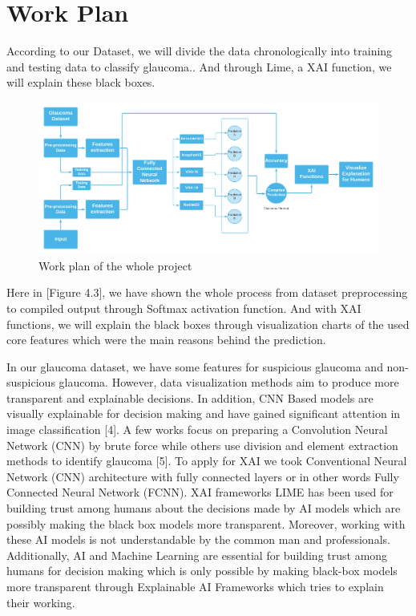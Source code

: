 \newpage
\section{Work Plan} 
According to our Dataset, we will divide the data chronologically into training and testing data to classify glaucoma.. And through Lime, a XAI function, we will explain these black boxes.

\begin{figure}[htbp]
\centering
\includegraphics[scale=0.08]{images/work plan.png}
\caption{Work plan of the whole project}
\label{fig:x Work plan of the whole project}
\end{figure}

\vspace{5mm}
\noindent Here in [Figure 4.3], we have shown the whole process from dataset preprocessing to compiled output through Softmax activation function. And with XAI functions, we will explain the black boxes through visualization charts of the used core features which were the main reasons behind the prediction.

\vspace{5mm}
\noindent In our glaucoma dataset, we have some features for suspicious glaucoma and non-suspicious glaucoma. However, data visualization methods aim to produce more transparent and explainable decisions. In addition, CNN Based models are visually explainable for decision making and have gained significant attention in image classification [4]. A few works focus on preparing a Convolution Neural Network (CNN) by brute force while others use division and element extraction methods to identify glaucoma [5]. To apply for XAI we took Conventional Neural Network (CNN) architecture with fully connected layers or in other words Fully Connected Neural Network (FCNN). XAI frameworks LIME has been used for building trust among humans about the decisions made by AI models which are possibly making the black box models more transparent. Moreover, working with these AI models is not understandable by the common man and professionals. Additionally, AI and Machine Learning are essential for building trust among humans for decision making which is only possible by making black-box models more transparent through Explainable AI Frameworks which tries to explain their working.